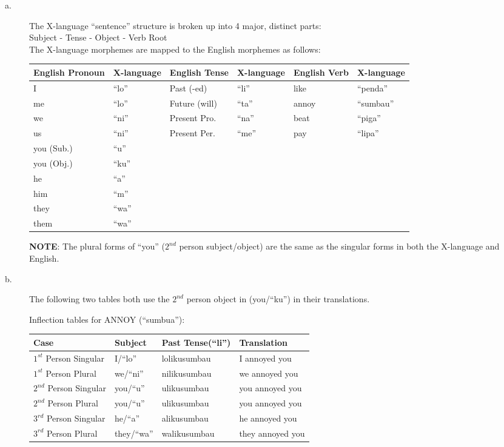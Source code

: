 \documentclass[11pt]{article}
\begin{document}
\begin{solution}

\begin{description}
\item[a.] The X-language ``sentence'' structure is broken up into 4 major, distinct parts: \\
Subject - Tense - Object - Verb Root \\
The X-language morphemes are mapped to the English morphemes as follows:

\begin{tabular}{l l | l l | l l}
English Pronoun & X-language & English Tense & X-language & English Verb & X-language \\ \hline 
I & ``lo'' & Past (-ed) & ``li'' & like & ``penda'' \\
me & ``lo'' & Future (will) & ``ta'' & annoy & ``sumbau'' \\
we & ``ni'' & Present Pro. & ``na'' & beat & ``piga'' \\
us & ``ni'' & Present Per. & ``me'' & pay & ``lipa'' \\
you (Sub.) & ``u'' & & & &  \\
you (Obj.) & ``ku'' & & & & \\
he & ``a'' & & & & \\
him & ``m'' & & & & \\
they & ``wa'' & & & & \\
them & ``wa'' & & & & \\
\end{tabular}

\textbf{NOTE}: The plural forms of ``you'' ($2^{nd}$ person subject/object) are the same as the singular forms in both the X-language and English.

\item[b.] The following two tables both use the $2^{nd}$ person object in (you/``ku'') in their translations.

Inflection tables for ANNOY (``sumbua''):

\begin{tabular}{l l | l l}
Case & Subject & Past Tense(``li'') & Translation \\ \hline
$1^{st}$ Person Singular & I/``lo'' & lolikusumbau & I annoyed you \\
$1^{st}$ Person Plural & we/``ni'' & nilikusumbau & we annoyed you \\
$2^{nd}$ Person Singular & you/``u'' & ulikusumbau & you annoyed you \\
$2^{nd}$ Person Plural & you/``u'' & ulikusumbau & you annoyed you \\
$3^{rd}$ Person Singular & he/``a'' & alikusumbau & he annoyed you  \\
$3^{rd}$ Person Plural & they/``wa'' & walikusumbau & they annoyed you \\ \hline
\end{tabular}


\end{description}
\end{solution}
\end{document}
